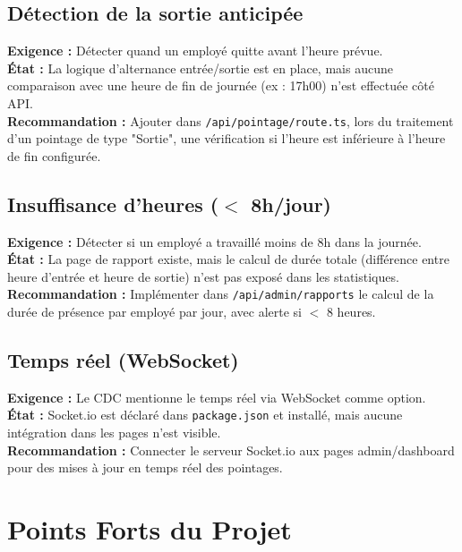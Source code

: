 \documentclass[12pt,a4paper]{article}
\begin{document}
\subsection{Détection de la sortie anticipée}
\textbf{Exigence :} Détecter quand un employé quitte avant l'heure prévue.\\
\textbf{État :} La logique d'alternance entrée/sortie est en place, mais aucune comparaison avec une heure de fin de journée (ex : 17h00) n'est effectuée côté API.\\
\textbf{Recommandation :} Ajouter dans \texttt{/api/pointage/route.ts}, lors du traitement d'un pointage de type "Sortie", une vérification si l'heure est inférieure à l'heure de fin configurée.

\subsection{Insuffisance d'heures ($<$ 8h/jour)}
\textbf{Exigence :} Détecter si un employé a travaillé moins de 8h dans la journée.\\
\textbf{État :} La page de rapport existe, mais le calcul de durée totale (différence entre heure d'entrée et heure de sortie) n'est pas exposé dans les statistiques.\\
\textbf{Recommandation :} Implémenter dans \texttt{/api/admin/rapports} le calcul de la durée de présence par employé par jour, avec alerte si $<$ 8 heures.

\subsection{Temps réel (WebSocket)}
\textbf{Exigence :} Le CDC mentionne le temps réel via WebSocket comme option.\\
\textbf{État :} Socket.io est déclaré dans \texttt{package.json} et installé, mais aucune intégration dans les pages n'est visible.\\
\textbf{Recommandation :} Connecter le serveur Socket.io aux pages admin/dashboard pour des mises à jour en temps réel des pointages.

\section{Points Forts du Projet}
\end{document}
